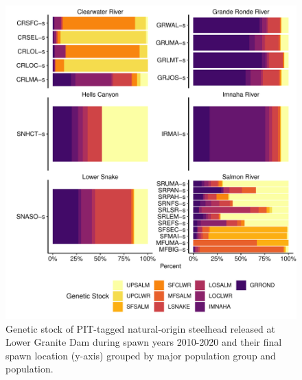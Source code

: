 \documentclass[11pt,a4paper,]{article}
\begin{document}
\begin{figure}
\centering
\includegraphics{Kelt_Summary_files/figure-latex/sum-gsi-1.pdf}
\caption{\label{fig:sum-gsi}Genetic stock of PIT-tagged natural-origin steelhead released at Lower Granite Dam during spawn years 2010-2020 and their final spawn location (y-axis) grouped by major population group and population.}
\end{figure}
\end{document}
